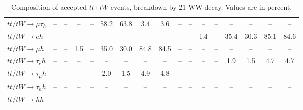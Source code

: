 \begin{sidewaystable}[p]
\begin{tabular}{|l|cc|cc|cc|cc|cc|cc|cc|cc|}
    $tt/tW \to \mu\tau_{h}$            &   -- &   -- &   -- &   -- & 58.2 & 63.8 &  3.4 &  3.6 &   -- &   -- &   -- &   -- &   -- &   -- &   -- &   -- \\ 
    $tt/tW \to eh$                     &   -- &   -- &   -- &   -- &   -- &   -- &   -- &   -- &   -- &   -- &  1.4 &   -- & 35.4 & 30.3 & 85.1 & 84.6 \\ 
    $tt/tW \to \mu h$                  &   -- &   -- &  1.5 &   -- & 35.0 & 30.0 & 84.8 & 84.5 &   -- &   -- &   -- &   -- &   -- &   -- &   -- &   -- \\ 
    $tt/tW \to \tau_{e}h$              &   -- &   -- &   -- &   -- &   -- &   -- &   -- &   -- &   -- &   -- &   -- &   -- &  1.9 &  1.5 &  4.7 &  4.7 \\ 
    $tt/tW \to \tau_{\mu}h$            &   -- &   -- &   -- &   -- &  2.0 &  1.5 &  4.9 &  4.8 &   -- &   -- &   -- &   -- &   -- &   -- &   -- &   -- \\ 
    $tt/tW \to \tau_{h}h$              &   -- &   -- &   -- &   -- &   -- &   -- &   -- &   -- &   -- &   -- &   -- &   -- &   -- &   -- &   -- &   -- \\ 
    $tt/tW \to hh$                     &   -- &   -- &   -- &   -- &   -- &   -- &   -- &   -- &   -- &   -- &   -- &   -- &   -- &   -- &   -- &   -- \\ 

    \hline
    \end{tabular}
    \caption{Composition of accepted $t\bar{t}$+$tW$ events, breakdown by 21 WW decay.  Values are in percent.}
    \label{sigcomp}
    
\end{sidewaystable}
